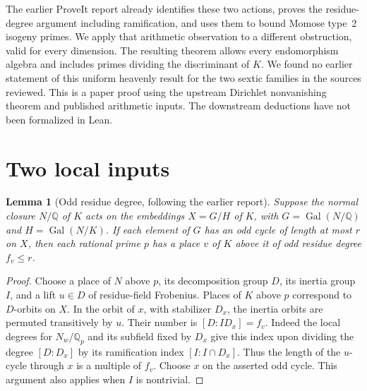 \documentclass[11pt]{article}
\newtheorem{lemma}[theorem]{Lemma}
\newcommand{\Q}{\mathbb Q}
\newcommand{\Gal}{\operatorname{Gal}}
\begin{document}
The earlier ProveIt report \cite{prior} already identifies these two
actions, proves the residue-degree argument including ramification, and
uses them to bound Momose type~2 isogeny primes. We apply that
arithmetic observation to a different obstruction, valid for every
dimension. The resulting theorem allows every endomorphism algebra and
includes primes dividing the discriminant of $K$. We found no earlier
statement of this uniform heavenly result for the two sextic families
in the sources reviewed. This is a paper proof using the upstream
Dirichlet nonvanishing theorem and published arithmetic inputs. The
downstream deductions have not been formalized in Lean.

\section{Two local inputs}

\begin{lemma}[Odd residue degree, following the earlier report]\label{cycles}
Suppose the normal closure $N/\Q$ of $K$ acts on the embeddings
$X=G/H$ of $K$, with $G=\Gal(N/\Q)$ and $H=\Gal(N/K)$.
If each element of $G$ has an odd cycle of length at most $r$ on $X$,
then each rational prime $p$ has a place $v$ of $K$ above it
of odd residue degree $f_v\le r$.
\end{lemma}
\begin{proof}
Choose a place of $N$ above $p$, its decomposition group $D$, its
inertia group $I$, and a lift $u\in D$ of residue-field Frobenius.
Places of $K$ above $p$ correspond to $D$-orbits on $X$.
In the orbit of $x$, with stabilizer $D_x$, the inertia orbits are
permuted transitively by $u$. Their number is $[D:I D_x]=f_v$.
Indeed the local degrees for $N_w/\Q_p$ and its subfield fixed by
$D_x$ give this index upon dividing the degree $[D:D_x]$ by its
ramification index $[I:I\cap D_x]$.
Thus the length of the $u$-cycle through $x$ is a multiple of $f_v$.
Choose $x$ on the asserted odd cycle. This argument also applies when
$I$ is nontrivial.
\end{proof}
\end{document}
